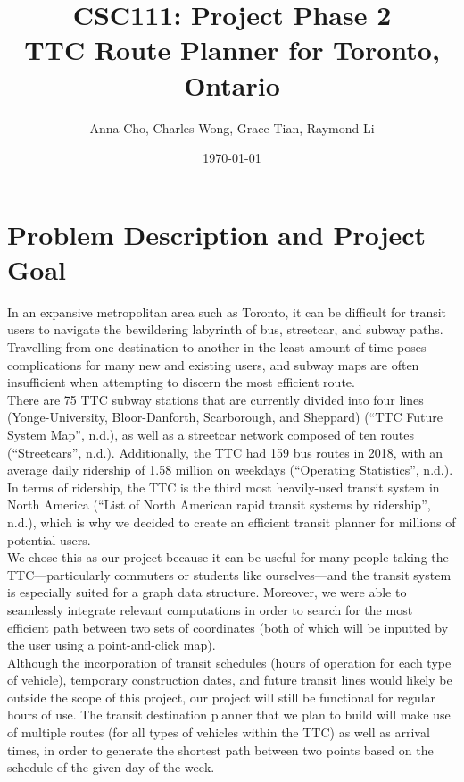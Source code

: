 \documentclass[fontsize=11pt]{article}
\title{CSC111: Project Phase 2 \\
TTC Route Planner for Toronto, Ontario}
\author{Anna Cho, Charles Wong, Grace Tian, Raymond Li}
\date{\today}
\begin{document}
    \maketitle

    \section*{Problem Description and Project Goal}
    In an expansive metropolitan area such as Toronto, it can be difficult for transit users to navigate the bewildering labyrinth of bus, streetcar, and subway paths. Travelling from one destination to another in the least amount of time poses complications for many new and existing users, and subway maps are often insufficient when attempting to discern the most efficient route. \\

    There are 75 TTC subway stations that are currently divided into four lines (Yonge-University, Bloor-Danforth, Scarborough, and Sheppard) (“TTC Future System Map”, n.d.), as well as a streetcar network composed of ten routes (“Streetcars”, n.d.). Additionally, the TTC had 159 bus routes in 2018, with an average daily ridership of 1.58 million on weekdays (“Operating Statistics”, n.d.). In terms of ridership, the TTC is the third most heavily-used transit system in North America (“List of North American rapid transit systems by ridership”, n.d.), which is why we decided to create an efficient transit planner for millions of potential users. \\

    We chose this as our project because it can be useful for many people taking the TTC—particularly commuters or students like ourselves—and the transit system is especially suited for a graph data structure. Moreover, we were able to seamlessly integrate relevant computations in order to search for the most efficient path between two sets of coordinates (both of which will be inputted by the user using a point-and-click map). \\

    Although the incorporation of transit schedules (hours of operation for each type of vehicle), temporary construction dates, and future transit lines would likely be outside the scope of this project, our project will still be functional for regular hours of use. The transit destination planner that we plan to build will make use of multiple routes (for all types of vehicles within the TTC) as well as arrival times, in order to generate the shortest path between two points based on the schedule of the given day of the week. \\
\end{document}
